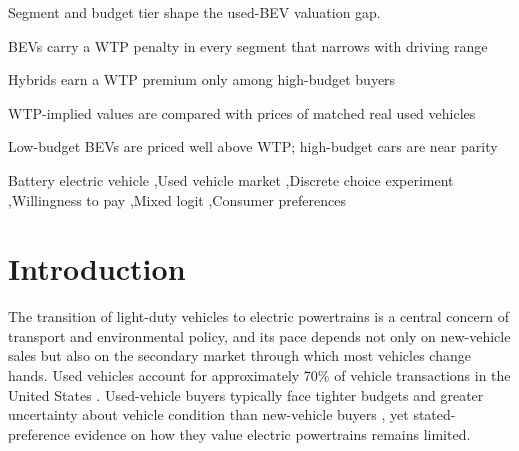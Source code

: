 \documentclass[a4paper,fleqn]{cas-sc}   %
\begin{document}
\begin{abstract}
We estimate willingness to pay (WTP) for powertrain and vehicle attributes in the U.S. used-vehicle market using a discrete choice experiment with 2,254 adults planning to buy a used car or SUV within two years, and compare the estimates with observed prices. Choice tasks varied powertrain (conventional, hybrid, battery electric), price, operating cost, range, vehicle age, and mileage. Four mixed logit models were estimated by vehicle segment and budget tier. The battery electric vehicle (BEV) powertrain carries a significant WTP penalty relative to conventional vehicles in every model, with large standard deviations indicating heterogeneous rather than uniformly averse preferences. Driving range narrows the BEV penalty, which is indistinguishable from zero only for high-budget car buyers. Matched real-market pairs show mixed results: two low-budget BEVs are priced well above WTP-implied values, a high-budget car BEV is consistent with it, and hybrid premiums fall below or above it.
\end{abstract}

\begin{highlights}
\item Segment and budget tier shape the used-BEV valuation gap.
\item BEVs carry a WTP penalty in every segment that narrows with driving range
\item Hybrids earn a WTP premium only among high-budget buyers
\item WTP-implied values are compared with prices of matched real used vehicles
\item Low-budget BEVs are priced well above WTP; high-budget cars are near parity
\end{highlights}



\begin{keywords}
Battery electric vehicle \sep Used vehicle market \sep Discrete choice experiment \sep Willingness to pay \sep Mixed logit \sep Consumer preferences
\end{keywords}

\maketitle
\doublespacing
\section{Introduction}
\label{section:intro}
The transition of light-duty vehicles to electric powertrains is a central concern of transport and environmental policy, and its pace depends not only on new-vehicle sales but also on the secondary market through which most vehicles change hands. Used vehicles account for approximately 70\% of vehicle transactions in the United States \parencite{bts2023}. Used-vehicle buyers typically face tighter budgets and greater uncertainty about vehicle condition than new-vehicle buyers \parencite{trd2024usedEV_adoption, robersonNotAllSubsidies2022, fernandesUSUnderstandingConsumer2023}, yet stated-preference evidence on how they value electric powertrains remains limited.
\end{document}
